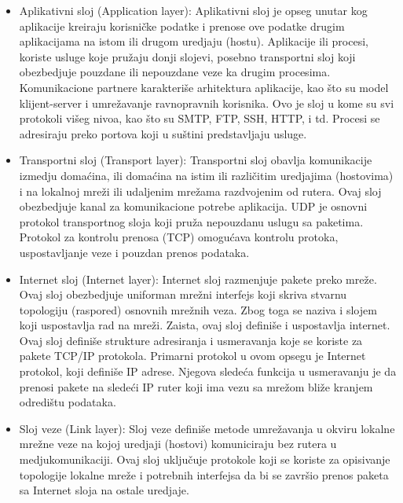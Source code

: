 \documentclass[a4paper,12pt, master]{etf}
\begin{document}
	\begin{itemize}
		\item Aplikativni sloj (Application layer):
		Aplikativni sloj je opseg unutar kog aplikacije kreiraju korisni\v{c}ke
		podatke i prenose ove podatke drugim aplikacijama na istom ili drugom
		uredjaju (hostu). Aplikacije ili procesi, koriste usluge koje
		pru\v{z}aju donji slojevi, posebno transportni sloj koji
		obezbedjuje pouzdane ili nepouzdane veze ka drugim procesima.
		Komunikacione partnere karakteri\v{s}e arhitektura aplikacije, kao
		\v{s}to su model klijent-server i umre\v{z}avanje ravnopravnih
		korisnika. Ovo je sloj u kome su svi protokoli vi\v{s}eg nivoa, kao
		\v{s}to su SMTP, FTP, SSH, HTTP, i td. Procesi se adresiraju preko
		portova koji u su\v{s}tini predstavljaju usluge.
		\item Transportni sloj (Transport layer):
		Transportni sloj obavlja komunikacije izmedju doma\'{c}ina, ili
		doma\'{c}ina na istim ili razli\v{c}itim uredjajima (hostovima) i na
		lokalnoj mre\v{z}i ili udaljenim mre\v{z}ama razdvojenim od rutera.
		Ovaj sloj obezbedjuje kanal za komunikacione potrebe aplikacija. UDP je
		osnovni protokol transportnog sloja koji pru\v{z}a nepouzdanu uslugu sa
		paketima. Protokol za kontrolu prenosa (TCP) omogu\'{c}ava kontrolu
		protoka, uspostavljanje veze i pouzdan prenos podataka.
		\item Internet sloj (Internet layer):
		Internet sloj razmenjuje pakete preko mre\v{z}e. Ovaj sloj obezbedjuje
		uniforman mre\v{z}ni interfejs koji skriva stvarnu topologiju (raspored)
		 osnovnih mre\v{z}nih veza. Zbog toga se naziva i slojem koji
		uspostavlja rad na mre\v{z}i. Zaista, ovaj sloj defini\v{s}e i
		uspostavlja	internet. Ovaj sloj defini\v{s}e strukture adresiranja i
		usmeravanja koje se koriste za pakete TCP/IP protokola. Primarni
		protokol u ovom opsegu je Internet protokol, koji defini\v{s}e IP
		adrese. Njegova slede\'{c}a funkcija u usmeravanju je da prenosi pakete
		na slede\'{c}i IP ruter koji ima vezu sa mre\v{z}om bli\v{z}e kranjem
		odredi\v{s}tu podataka.
		\item Sloj veze (Link layer):
		Sloj veze defini\v{s}e metode umre\v{z}avanja u okviru lokalne
		mre\v{z}ne veze na kojoj uredjaji (hostovi) komuniciraju bez rutera u
		medjukomunikaciji. Ovaj sloj uklju\v{c}uje protokole koji se koriste za
		opisivanje topologije lokalne mre\v{z}e i potrebnih interfejsa da bi se
		zavr\v{s}io prenos paketa sa Internet sloja na ostale uredjaje.
	\end{itemize}
\end{document}
